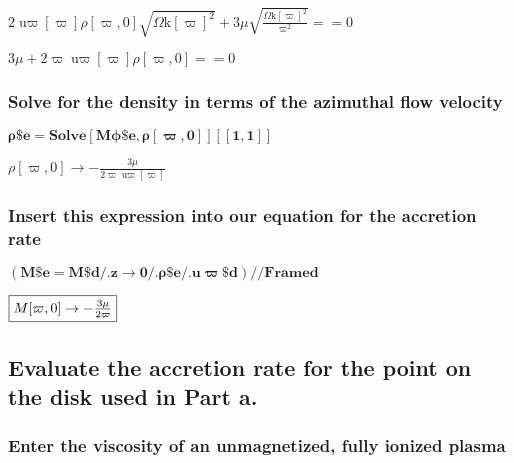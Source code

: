 \documentclass{article}
\begin{document}
\begin{doublespace}
\noindent\(2 \text{u$\varpi $}[\varpi ] \rho [\varpi ,0] \sqrt{\text{$\Omega $k}[\varpi ]^2}+3 \mu  \sqrt{\frac{\text{$\Omega $k}[\varpi ]^2}{\varpi
^2}}==0\)
\end{doublespace}

\begin{doublespace}
\noindent\(3 \mu +2 \varpi  \text{u$\varpi $}[\varpi ] \rho [\varpi ,0]==0\)
\end{doublespace}

\subsubsection*{Solve for the density in terms of the azimuthal flow velocity}

\begin{doublespace}
\noindent\(\pmb{\text{$\rho \$$e} = \text{Solve}[\text{M$\phi \$$e}, \rho [\varpi ,0]][[1,1]]}\)
\end{doublespace}

\begin{doublespace}
\noindent\(\rho [\varpi ,0]\to -\frac{3 \mu }{2 \varpi  \text{u$\varpi $}[\varpi ]}\)
\end{doublespace}

\subsubsection*{Insert this expression into our equation for the accretion rate}

\begin{doublespace}
\noindent\(\pmb{(\text{M$\$$e} = \text{M$\$$d} \text{/.} z\to  0\text{/.} \text{$\rho \$$e}\text{/.} \text{u$\varpi \$$d})\text{//}\text{Framed}}\)
\end{doublespace}

\begin{doublespace}
\noindent\(\fbox{$M[\varpi ,0]\to -\frac{3 \mu }{2 \varpi }$}\)
\end{doublespace}

\subsection*{Evaluate the accretion rate for the point on the disk used in Part a.}

\subsubsection*{Enter the viscosity of an unmagnetized, fully ionized plasma}
\end{document}
